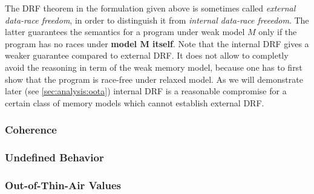 The DRF theorem in the formulation given above is 
sometimes called \emph{external data-race freedom},
in order to distinguish it from \emph{internal data-race freeedom}. 
The latter guarantees the \SC semantics for a program 
under weak model $M$ only if the program 
has no races under \textbf{model $\mathbf{M}$ itself}.
Note that the internal DRF gives a weaker guarantee 
compared to external DRF. It does not allow to completly 
avoid the reasoning in term of the weak memory model, 
because one has to first show that the program 
is race-free under relaxed model. 
As we will demonstrate later (see \cref{sec:analysis:oota})
internal DRF is a reasonable compromise
for a certain class of memory models which 
cannot establish external DRF.

\subsubsection{Coherence}
\label{sec:background:coh}

\subsubsection{Undefined Behavior}
\label{sec:background:ub}

\subsubsection{Out-of-Thin-Air Values}
\label{sec:background:oota}

